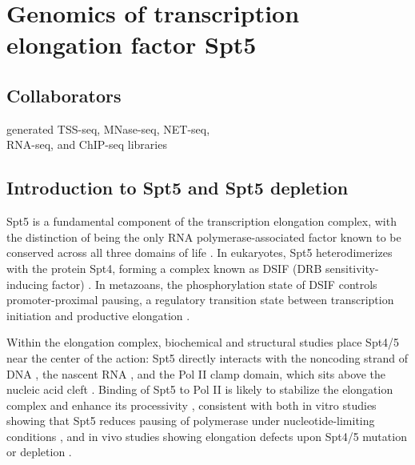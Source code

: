\chapter{Genomics of transcription elongation factor Spt5}
\label{chapter:five}

\section{Collaborators}

\begin{description}[align=right, leftmargin=!, labelwidth=5cm, noitemsep]
    \item [Ameet Shetty] generated TSS-seq, MNase-seq, NET-seq,\\RNA-seq, and ChIP-seq libraries
\end{description}

\section{Introduction to Spt5 and Spt5 depletion}

Spt5 is a fundamental component of the transcription elongation complex, with the distinction of being the only RNA polymerase-associated factor known to be conserved across all three domains of life \citep{hartzog2013, werner2012}.
In eukaryotes, Spt5 heterodimerizes with the protein Spt4, forming a complex known as DSIF (DRB sensitivity-inducing factor) \citep{hartzog1998,hirtreiter2010,schwer2009,wada1998}.
In metazoans, the phosphorylation state of DSIF controls promoter-proximal pausing, a regulatory transition state between transcription initiation and productive elongation \citep{adelman2012}.

Within the elongation complex, biochemical and structural studies place Spt4/5 near the center of the action: Spt5 directly interacts with the noncoding strand of DNA \citep{crickard2016,meyer2015}, the nascent RNA \citep{blythe2016, crickard2016,meyer2015}, and the Pol II clamp domain, which sits above the nucleic acid cleft \citep{hirtreiter2010, martinez-rucobo2011, viktorovskaya2011, yamaguchi1999}.
Binding of Spt5 to Pol II is likely to stabilize the elongation complex and enhance its processivity \citep{hirtreiter2010,klein2011,martinez-rucobo2011}, consistent with both in vitro studies showing that Spt5 reduces pausing of polymerase under nucleotide-limiting conditions \citep{guo2000,wada1998,zhu2007}, and in vivo studies showing elongation defects upon Spt4/5 mutation or depletion \citep{diamant2016,kramer2016,liu2012,mason2005,morillon2003,quan2010,rondon2003}.

